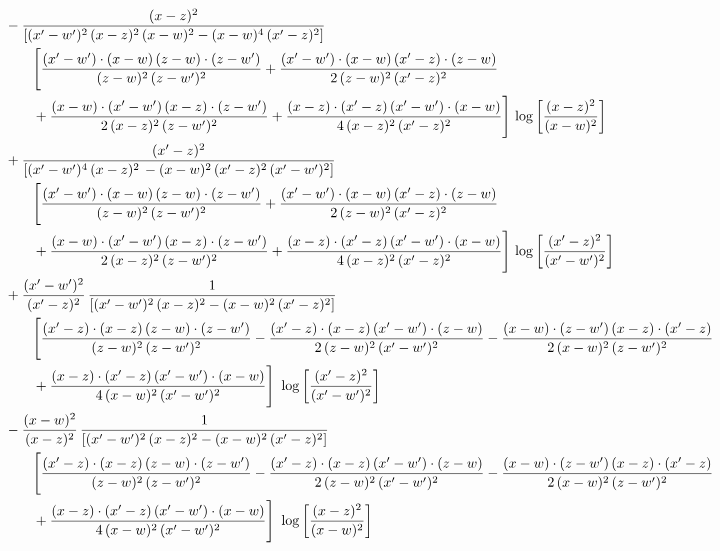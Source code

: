 \documentclass[10pt]{article}
\numberwithin{equation}{section}
\begin{document}
\begin{align}
&\qquad-\frac{(x-z)^{2}}{\left[(x^{\prime}-w^{\prime})^{2}\,(x-z)^{2}\,(x-w)^{2} - (x-w)^{4}\, (x^{\prime}-z)^{2}\right]}\,  \notag\\&\qquad\qquad  \Bigg[\frac{(x^{\prime}-w^{\prime})\cdot (x-w)\, (z-w)\cdot (z-w^{\prime})}{(z-w)^{2}\, (z-w^{\prime})^{2}}+\frac{(x^{\prime}-w^{\prime})\cdot (x-w)\, (x^{\prime}-z)\cdot (z-w)}{2\, (z-w)^{2}\, (x^{\prime}-z)^{2}}\notag\\&\qquad\qquad  +\frac{(x-w)\cdot (x^{\prime}-w^{\prime})\, (x-z)\cdot (z-w^{\prime})}{2\, (x-z)^{2}\, (z-w^{\prime})^{2}}+\frac{(x-z)\cdot (x^{\prime}-z)\, (x^{\prime}-w^{\prime})\cdot (x-w)}{4\, (x-z)^{2}\, (x^{\prime}-z)^{2}}\Bigg] \,\log{\left[\frac{(x-z)^{2}}{(x-w)^{2}}\right]}\notag\\
&\qquad+\frac{(x^{\prime}-z)^{2}}{\left[(x^{\prime}-w^{\prime})^{4}\,(x-z)^{2}\, - (x-w)^{2}\, (x^{\prime}-z)^{2}\,(x^{\prime}-w^{\prime})^{2}\right]}\,  \notag\\&\qquad\qquad  \Bigg[\frac{(x^{\prime}-w^{\prime})\cdot (x-w)\, (z-w)\cdot (z-w^{\prime})}{(z-w)^{2}\, (z-w^{\prime})^{2}}+\frac{(x^{\prime}-w^{\prime})\cdot (x-w)\, (x^{\prime}-z)\cdot (z-w)}{2\, (z-w)^{2}\, (x^{\prime}-z)^{2}}\notag\\&\qquad\qquad  +\frac{(x-w)\cdot (x^{\prime}-w^{\prime})\, (x-z)\cdot (z-w^{\prime})}{2\, (x-z)^{2}\, (z-w^{\prime})^{2}}+\frac{(x-z)\cdot (x^{\prime}-z)\, (x^{\prime}-w^{\prime})\cdot (x-w)}{4\, (x-z)^{2}\, (x^{\prime}-z)^{2}}\Bigg] \,\log{\left[\frac{(x^{\prime}-z)^{2}}{(x^{\prime}-w^{\prime})^{2}}\right]}\notag\\
&\qquad+\frac{(x^{\prime}-w^{\prime})^{2}}{(x^{\prime}-z)^{2}}\, \frac{1}{\left[(x^{\prime}-w^{\prime})^{2}\, (x-z)^{2} - (x-w)^{2}\, (x^{\prime}-z)^{2}\right]} \notag\\&\qquad\qquad  \Bigg[\frac{(x^{\prime}-z)\cdot (x-z)\, (z-w)\cdot (z-w^{\prime})}{(z-w)^{2}\, (z-w^{\prime})^{2}}-\frac{(x^{\prime}-z)\cdot (x-z)\, (x^{\prime}-w^{\prime})\cdot (z-w)}{2\, (z-w)^{2}\, (x^{\prime}-w^{\prime})^{2}} -\frac{(x-w)\cdot (z-w^{\prime})\, (x-z)\cdot (x^{\prime}-z)}{2\, (x-w)^{2}\, (z-w^{\prime})^{2}}\notag\\&\qquad\qquad  +\frac{(x-z)\cdot (x^{\prime}-z)\, (x^{\prime}-w^{\prime})\cdot (x-w)}{4\, (x-w)^{2}\, (x^{\prime}-w^{\prime})^{2}}\Bigg]\,\, \log{\left[\frac{(x^{\prime}-z)^{2}}{(x^{\prime}-w^{\prime})^{2}}\right]}\notag\\
&\qquad-\frac{(x-w)^{2}}{(x-z)^{2}}\, \frac{1}{\left[(x^{\prime}-w^{\prime})^{2}\, (x-z)^{2} - (x-w)^{2}\, (x^{\prime}-z)^{2}\right]} \notag\\&\qquad\qquad  \Bigg[\frac{(x^{\prime}-z)\cdot (x-z)\, (z-w)\cdot (z-w^{\prime})}{(z-w)^{2}\, (z-w^{\prime})^{2}}-\frac{(x^{\prime}-z)\cdot (x-z)\, (x^{\prime}-w^{\prime})\cdot (z-w)}{2\, (z-w)^{2}\, (x^{\prime}-w^{\prime})^{2}} -\frac{(x-w)\cdot (z-w^{\prime})\, (x-z)\cdot (x^{\prime}-z)}{2\, (x-w)^{2}\, (z-w^{\prime})^{2}}\notag\\&\qquad\qquad  +\frac{(x-z)\cdot (x^{\prime}-z)\, (x^{\prime}-w^{\prime})\cdot (x-w)}{4\, (x-w)^{2}\, (x^{\prime}-w^{\prime})^{2}}\Bigg]\,\, \log{\left[\frac{(x-z)^{2}}{(x-w)^{2}}\right]}\notag\\

\end{align}
\end{document}
